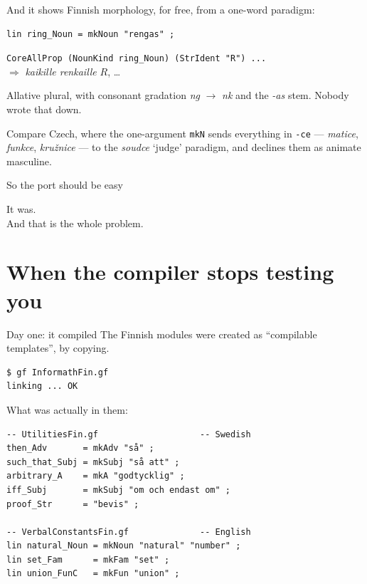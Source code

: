 \documentclass[10pt,aspectratio=169]{beamer}
\newcommand{\ok}[1]{\textcolor{good}{#1}}
\begin{document}
\begin{frame}[fragile]{And it shows}
  Finnish morphology, for free, from a one-word paradigm:

\begin{lstlisting}
lin ring_Noun = mkNoun "rengas" ;
\end{lstlisting}

  \vspace{0.5em}
  \begin{center}
    \texttt{CoreAllProp (NounKind ring\_Noun) (StrIdent "R") ...} \\[0.4em]
    $\Longrightarrow$ \quad \ok{\emph{kaikille renkaille} $R$, \dots}
  \end{center}

  \vspace{0.8em}
  Allative plural, with consonant gradation \emph{ng} $\rightarrow$ \emph{nk}
  and the \emph{-as} stem. Nobody wrote that down.

  \vspace{0.5em}
  \small
  Compare Czech, where the one-argument \texttt{mkN} sends everything in
  \texttt{-ce} --- \emph{matice}, \emph{funkce}, \emph{kružnice} --- to the
  \emph{soudce} `judge' paradigm, and declines them as animate masculine.
\end{frame}

\begin{frame}{So the port should be easy}
  \begin{center}
  \Large It was. \\[1em]
  \normalsize And that is the whole problem.
  \end{center}
\end{frame}

\section{When the compiler stops testing you}

\begin{frame}[fragile]{Day one: it compiled}
  The Finnish modules were created as ``compilable templates'', by copying.

\begin{lstlisting}
$ gf InformathFin.gf
linking ... OK
\end{lstlisting}

  \vspace{0.5em}
  What was actually in them:

\begin{lstlisting}
-- UtilitiesFin.gf                    -- Swedish
then_Adv       = mkAdv "så" ;
such_that_Subj = mkSubj "så att" ;
arbitrary_A    = mkA "godtycklig" ;
iff_Subj       = mkSubj "om och endast om" ;
proof_Str      = "bevis" ;

-- VerbalConstantsFin.gf              -- English
lin natural_Noun = mkNoun "natural" "number" ;
lin set_Fam      = mkFam "set" ;
lin union_FunC   = mkFun "union" ;
\end{lstlisting}
\end{frame}
\end{document}

